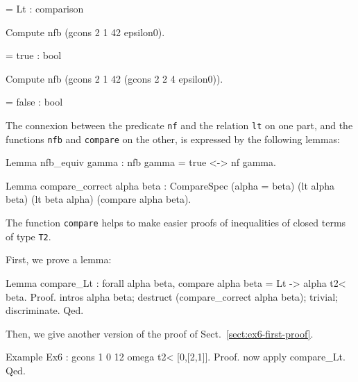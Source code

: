 {\begin{Coqanswer}
   = Lt
     : comparison
\end{Coqanswer}

\begin{Coqsrc}
Compute nfb  (gcons 2 1 42 epsilon0).
\end{Coqsrc}

\begin{Coqanswer}
   = true
     : bool
\end{Coqanswer}

\begin{Coqsrc}
Compute nfb (gcons 2 1 42 (gcons 2 2 4 epsilon0)).
\end{Coqsrc}

\begin{Coqanswer}
   = false
     : bool
\end{Coqanswer}

\begin{remark}
The connexion between the predicate \texttt{nf} and the relation \texttt{lt} on one part, and the functions \texttt{nfb} and \texttt{compare} on the other, is expressed by the following lemmas:

\begin{Coqsrc}
Lemma nfb_equiv gamma : nfb gamma = true <-> nf gamma.

Lemma compare_correct alpha beta :
  CompareSpec (alpha = beta) (lt alpha beta) (lt beta alpha)
              (compare alpha beta).
\end{Coqsrc}

The function \texttt{compare} helps to make easier proofs of inequalities of
closed terms of type \texttt{T2}.

First, we prove a lemma:

\begin{Coqsrc}
Lemma compare_Lt : forall alpha beta, compare alpha beta = Lt -> 
                                         alpha t2< beta.
Proof.
  intros alpha beta; destruct (compare_correct alpha beta);
    trivial; discriminate. 
Qed.
\end{Coqsrc}

Then, we give another version of the proof of Sect.~\vref{sect:ex6-first-proof}.

\begin{Coqsrc}
Example Ex6 : gcons 1 0 12 omega t2< [0,[2,1]].
Proof. now apply compare_Lt. Qed.
\end{Coqsrc}

\end{remark}


}
